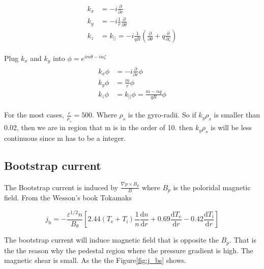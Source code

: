 \begin{eqnarray}
\begin{aligned}
k_{x}{}&=-i\frac{\partial}{\partial r}\\
k_{y}&=-i\frac{1}{r}\frac{\partial}{\partial \theta}\\
k_z&=k_{||}=-i \frac{1}{qR}(\frac{\partial}{\partial \theta }+q\frac{\partial}{\partial \zeta})
\end{aligned}
\end{eqnarray}

Plug $k_x$ and $k_y$ into $\phi=e^{im\theta -in \zeta }$\\

\begin{eqnarray}
\begin{aligned}
k_{x}\phi{}&=-i\frac{\partial}{\partial r}\phi\\
k_{y}\phi&=\frac{m}{r}\phi\\
k_{z}\phi&=k_{||}\phi= \frac{m-nq}{qR}\phi
\label{eq:k_slab}
\end{aligned}
\end{eqnarray}

For the most cases, $\frac{r}{\rho_s}=500$. Where $\rho_s$ is the gyro-radii. So if $k_y\rho_s$ is smaller than 0.02, then we are in region that m is in the order of 10. then $k_y\rho_s$ is will be less continuous since m has to be a integer. 

\subsection{Bootstrap current}

The Bootstrap current is induced by $\frac{\nabla p \times B_p}{B}$ where $B_p$ is the poloridal magnetic field. From the Wesson's book Tokamaks \cite{Tokamaks}


\begin{equation}
j_{\mathrm{b}}=-\frac{\varepsilon^{1 / 2} n}{B_{\theta}}\left[2.44\left(T_{\mathrm{e}}+T_{\mathrm{i}}\right) \frac{1}{n} \frac{\mathrm{d} n}{\mathrm{d} r}+0.69 \frac{\mathrm{d} T_{\mathrm{e}}}{\mathrm{d} r}-0.42 \frac{\mathrm{d} T_{\mathrm{i}}}{\mathrm{d} r}\right]
\end{equation}

The bootstrap current will induce magnetic field that is opposite the $B_p$. That is the the reason why the pedestal region where the pressure gradient is high. The magnetic shear is small. As the the Figure\ref{fig:j_bs} shows. 

